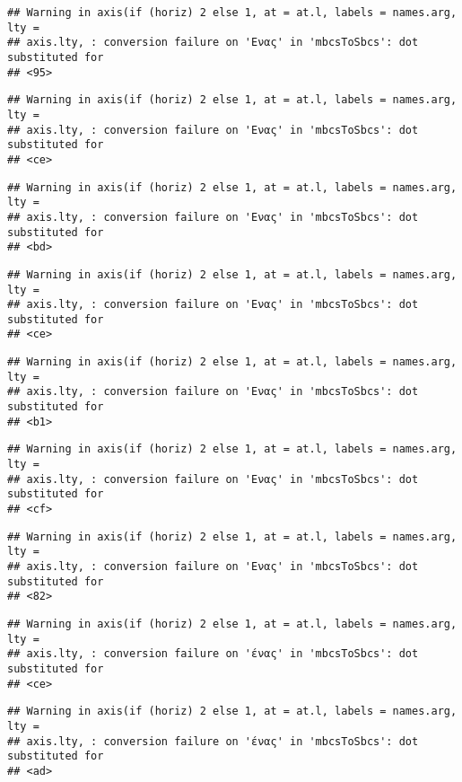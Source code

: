 \documentclass[
]{article}
\begin{document}
\begin{verbatim}
## Warning in axis(if (horiz) 2 else 1, at = at.l, labels = names.arg, lty =
## axis.lty, : conversion failure on 'Ενας' in 'mbcsToSbcs': dot substituted for
## <95>
\end{verbatim}

\begin{verbatim}
## Warning in axis(if (horiz) 2 else 1, at = at.l, labels = names.arg, lty =
## axis.lty, : conversion failure on 'Ενας' in 'mbcsToSbcs': dot substituted for
## <ce>
\end{verbatim}

\begin{verbatim}
## Warning in axis(if (horiz) 2 else 1, at = at.l, labels = names.arg, lty =
## axis.lty, : conversion failure on 'Ενας' in 'mbcsToSbcs': dot substituted for
## <bd>
\end{verbatim}

\begin{verbatim}
## Warning in axis(if (horiz) 2 else 1, at = at.l, labels = names.arg, lty =
## axis.lty, : conversion failure on 'Ενας' in 'mbcsToSbcs': dot substituted for
## <ce>
\end{verbatim}

\begin{verbatim}
## Warning in axis(if (horiz) 2 else 1, at = at.l, labels = names.arg, lty =
## axis.lty, : conversion failure on 'Ενας' in 'mbcsToSbcs': dot substituted for
## <b1>
\end{verbatim}

\begin{verbatim}
## Warning in axis(if (horiz) 2 else 1, at = at.l, labels = names.arg, lty =
## axis.lty, : conversion failure on 'Ενας' in 'mbcsToSbcs': dot substituted for
## <cf>
\end{verbatim}

\begin{verbatim}
## Warning in axis(if (horiz) 2 else 1, at = at.l, labels = names.arg, lty =
## axis.lty, : conversion failure on 'Ενας' in 'mbcsToSbcs': dot substituted for
## <82>
\end{verbatim}

\begin{verbatim}
## Warning in axis(if (horiz) 2 else 1, at = at.l, labels = names.arg, lty =
## axis.lty, : conversion failure on 'ένας' in 'mbcsToSbcs': dot substituted for
## <ce>
\end{verbatim}

\begin{verbatim}
## Warning in axis(if (horiz) 2 else 1, at = at.l, labels = names.arg, lty =
## axis.lty, : conversion failure on 'ένας' in 'mbcsToSbcs': dot substituted for
## <ad>
\end{verbatim}
\end{document}
